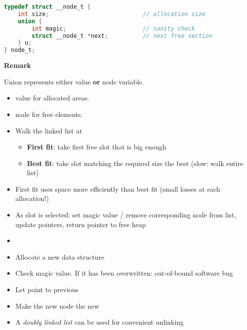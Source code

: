 \begin{lstlisting}[language={C}]
typedef struct __node_t {
    int size;                           // allocation size
    union {
        int magic;                      // sanity check
        struct __node_t *next;          // next free section
    } u;
} node_t;         
\end{lstlisting}
\textbf{Remark}

Union represents either  value \textbf{or}  node variable.
\begin{itemize}
    \item {} value for allocated areas.
    \item {} node for free elements.
\end{itemize}


\begin{itemize}
    \item Walk the linked list at  %
          \begin{itemize}
              \item \textbf{First fit}: take first free slot that is big enough
              \item \textbf{Best fit}: take slot matching the required size the best (slow: walk entire list)
          \end{itemize}
    \item First fit uses space more efficiently than best fit (small losses at each allocation!)
    \item As slot is selected: set magic value / remove corresponding node from list, update pointers, return pointer to free heap
\end{itemize}


\begin{itemize}
    \item {}%
    \item Allocate a new  data structure
    \item Check magic value. If it has been overwritten: out-of-bound software bug
    \item Let  point to previous 
    \item Make the new node the new 
    \item A \textit{doubly linked list} can be used for convenient unlinking
\end{itemize}

